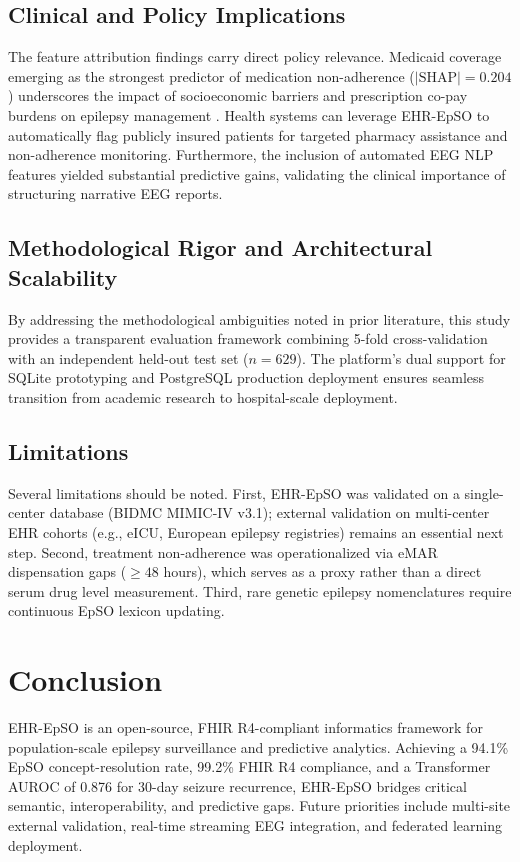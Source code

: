 \documentclass[11pt,a4paper]{article}
\begin{document}
\subsection{Clinical and Policy Implications}
The feature attribution findings carry direct policy relevance. Medicaid coverage emerging as the strongest predictor of medication non-adherence ($|\text{SHAP}| = 0.204$) underscores the impact of socioeconomic barriers and prescription co-pay burdens on epilepsy management \cite{hovinga2008association}. Health systems can leverage EHR-EpSO to automatically flag publicly insured patients for targeted pharmacy assistance and non-adherence monitoring. Furthermore, the inclusion of automated EEG NLP features yielded substantial predictive gains, validating the clinical importance of structuring narrative EEG reports.

\subsection{Methodological Rigor and Architectural Scalability}
By addressing the methodological ambiguities noted in prior literature, this study provides a transparent evaluation framework combining 5-fold cross-validation with an independent held-out test set ($n=629$). The platform's dual support for SQLite prototyping and PostgreSQL production deployment ensures seamless transition from academic research to hospital-scale deployment.

\subsection{Limitations}
Several limitations should be noted. First, EHR-EpSO was validated on a single-center database (BIDMC MIMIC-IV v3.1); external validation on multi-center EHR cohorts (e.g., eICU, European epilepsy registries) remains an essential next step. Second, treatment non-adherence was operationalized via eMAR dispensation gaps ($\ge 48$ hours), which serves as a proxy rather than a direct serum drug level measurement. Third, rare genetic epilepsy nomenclatures require continuous EpSO lexicon updating.

\section{Conclusion}

EHR-EpSO is an open-source, FHIR R4-compliant informatics framework for population-scale epilepsy surveillance and predictive analytics. Achieving a 94.1\% EpSO concept-resolution rate, 99.2\% FHIR R4 compliance, and a Transformer AUROC of 0.876 for 30-day seizure recurrence, EHR-EpSO bridges critical semantic, interoperability, and predictive gaps. Future priorities include multi-site external validation, real-time streaming EEG integration, and federated learning deployment.
\end{document}

